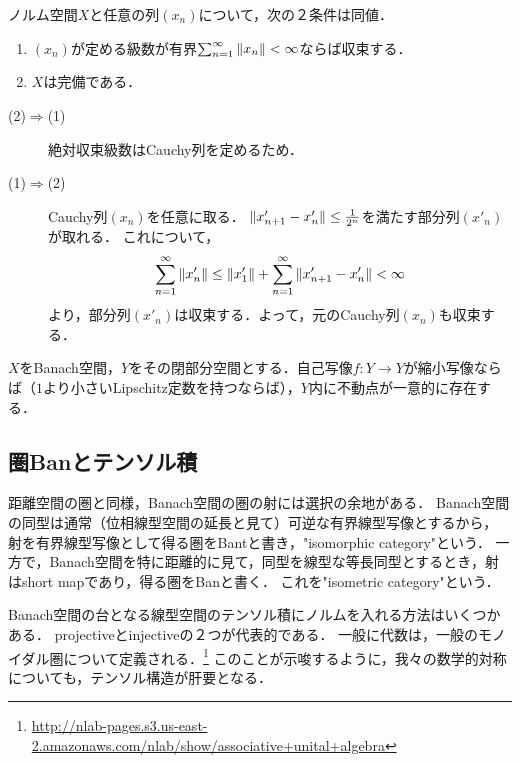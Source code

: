 \documentclass[uplatex,dvipdfmx]{jsreport}
\begin{document}
\begin{theorem}[絶対収束級数なるクラスの定義]
    ノルム空間$X$と任意の列$(x_n)$について，次の２条件は同値．
    \begin{enumerate}
        \item $(x_n)$が定める級数が有界$\sum^\infty_{n=1}\|x_n\|<\infty$ならば収束する．
        \item $X$は完備である．
    \end{enumerate}
\end{theorem}
\begin{Proof}\mbox{}
    \begin{description}
        \item[(2)$\Rightarrow$(1)] 絶対収束級数はCauchy列を定めるため．
        \item[(1)$\Rightarrow$(2)] Cauchy列$(x_n)$を任意に取る．
        $\|x'_{n+1}-x'_n\|\le\frac{1}{2^n}$を満たす部分列$(x'_n)$が取れる．
        これについて，
        \[\sum_{n=1}^\infty\|x'_n\|\le\|x'_1\|+\sum_{n=1}^\infty\|x'_{n+1}-x'_n\|<\infty\]
        より，部分列$(x'_n)$は収束する．よって，元のCauchy列$(x_n)$も収束する．
    \end{description}
\end{Proof}

\begin{theorem}
    $X$をBanach空間，$Y$をその閉部分空間とする．自己写像$f:Y\to Y$が縮小写像ならば（$1$より小さいLipschitz定数を持つならば），$Y$内に不動点が一意的に存在する．
\end{theorem}

\subsection{圏Banとテンソル積}

\begin{tcolorbox}[colframe=ForestGreen, colback=ForestGreen!10!white,breakable,colbacktitle=ForestGreen!40!white,coltitle=black,fonttitle=\bfseries\sffamily,
title=]
    距離空間の圏と同様，Banach空間の圏の射には選択の余地がある．
    Banach空間の同型は通常（位相線型空間の延長と見て）可逆な有界線型写像とするから，
    射を有界線型写像として得る圏をBantと書き，"isomorphic category"という．
    一方で，Banach空間を特に距離的に見て，同型を線型な等長同型とするとき，射はshort mapであり，得る圏をBanと書く．
    これを"isometric category"という．

    Banach空間の台となる線型空間のテンソル積にノルムを入れる方法はいくつかある．
    projectiveとinjectiveの２つが代表的である．
    一般に代数は，一般のモノイダル圏について定義される．\footnote{\url{http://nlab-pages.s3.us-east-2.amazonaws.com/nlab/show/associative+unital+algebra}}
    このことが示唆するように，我々の数学的対称についても，テンソル構造が肝要となる．
\end{tcolorbox}
\end{document}
